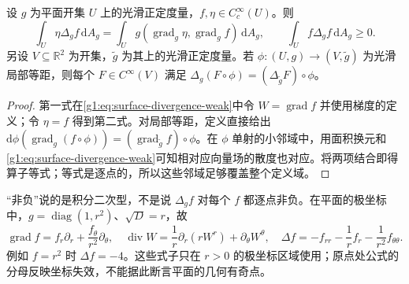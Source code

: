 \begin{proposition}\label{g1:prop:surface-laplacian-energy}
	设 \(g\) 为平面开集 \(U\) 上的光滑正定度量，\(f,\eta\in C_c^\infty(U)\)。则
	\[
		\int_U\eta\Delta_g f\,\mathrm{d}A_g
		=\int_U g(\operatorname{grad}_g\eta,\operatorname{grad}_gf)\,\mathrm{d}A_g,
		\qquad
		\int_Uf\Delta_g f\,\mathrm{d}A_g\ge0.
	\]
	另设 \(V\subseteq\mathbb R^2\) 为开集，\(\widetilde g\) 为其上的光滑正定度量。若 \(\phi:(U,g)\rightarrow(V,\widetilde g)\) 为光滑局部等距，则每个 \(F\in C^\infty(V)\) 满足 \(\Delta_g(F\circ\phi)=(\Delta_{\widetilde g}F)\circ\phi\)。
\end{proposition}

\begin{proof}
	第一式在\eqref{g1:eq:surface-divergence-weak}中令 \(W=\operatorname{grad}f\) 并使用梯度的定义；令 \(\eta=f\) 得到第二式。对局部等距，定义直接给出 \(\mathrm{d}\phi(\operatorname{grad}_g(f\circ\phi))=(\operatorname{grad}_{\widetilde g}f)\circ\phi\)。在 \(\phi\) 单射的小邻域中，用面积换元和\eqref{g1:eq:surface-divergence-weak}可知相对应向量场的散度也对应。将两项结合即得算子等式；等式是逐点的，所以这些邻域足够覆盖整个定义域。
\end{proof}

“非负”说的是积分二次型，不是说 \(\Delta_g f\) 对每个 \(f\) 都逐点非负。在平面的极坐标中，\(g=\operatorname{diag}(1,r^2)\)、\(\sqrt D=r\)，故
\[
	\operatorname{grad}f=f_r\partial_r+\frac{f_\theta}{r^2}\partial_\theta,\quad
	\operatorname{div}W=\frac1r\partial_r(rW^r)+\partial_\theta W^\theta,\quad
	\Delta f=-f_{rr}-\frac1rf_r-\frac1{r^2}f_{\theta\theta}.
\]
例如 \(f=r^2\) 时 \(\Delta f=-4\)。这些式子只在 \(r>0\) 的极坐标区域使用；原点处公式的分母反映坐标失效，不能据此断言平面的几何有奇点。
